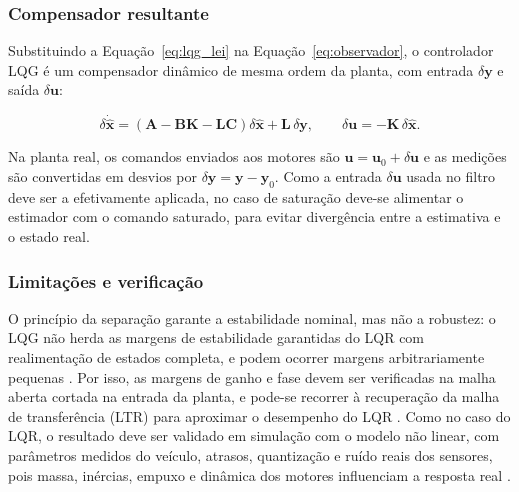 \subsubsection{Compensador resultante}

Substituindo a Equação~\eqref{eq:lqg_lei} na Equação~\eqref{eq:observador}, o controlador LQG é um compensador dinâmico de mesma ordem da planta, com entrada $\delta\mathbf{y}$ e saída $\delta\mathbf{u}$:

\begin{equation}\label{eq:compensador}
\delta\dot{\hat{\mathbf{x}}}=\left(\mathbf{A}-\mathbf{B}\mathbf{K}-\mathbf{L}\mathbf{C}\right)\delta\hat{\mathbf{x}}+\mathbf{L}\,\delta\mathbf{y},\qquad
\delta\mathbf{u}=-\mathbf{K}\,\delta\hat{\mathbf{x}}.
\end{equation}

\noindent Na planta real, os comandos enviados aos motores são $\mathbf{u}=\mathbf{u}_0+\delta\mathbf{u}$ e as medições são convertidas em desvios por $\delta\mathbf{y}=\mathbf{y}-\mathbf{y}_0$. Como a entrada $\delta\mathbf{u}$ usada no filtro deve ser a efetivamente aplicada, no caso de saturação deve-se alimentar o estimador com o comando saturado, para evitar divergência entre a estimativa e o estado real.

\subsubsection{Limitações e verificação}

O princípio da separação garante a estabilidade nominal, mas não a robustez: o LQG não herda as margens de estabilidade garantidas do LQR com realimentação de estados completa, e podem ocorrer margens arbitrariamente pequenas \cite{doyle1978}. Por isso, as margens de ganho e fase devem ser verificadas na malha aberta cortada na entrada da planta, e pode-se recorrer à recuperação da malha de transferência (LTR) para aproximar o desempenho do LQR \cite{doylestein1979,skogestad2005}. Como no caso do LQR, o resultado deve ser validado em simulação com o modelo não linear, com parâmetros medidos do veículo, atrasos, quantização e ruído reais dos sensores, pois massa, inércias, empuxo e dinâmica dos motores influenciam a resposta real \cite{jafari2010,okyere2019}.



